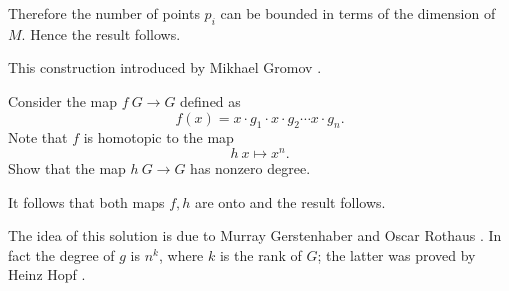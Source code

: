 Therefore the number of points $p_i$ can be bounded in terms of the dimension of $M$.
Hence the result follows.
\qeds

This construction introduced by Mikhael Gromov \cite[see][]{gromov-almost-flat}.

Consider the map $f\:G\to G$ defined as
\[f(x)=x\cdot g_1\cdot x\cdot g_2\cdots x\cdot g_n.\]
Note that $f$ is homotopic to the map 
\[h\:x\mapsto x^n.\]
Show that  the map $h\:G\to G$ has nonzero degree.

It follows that both maps $f,h$ are onto and the result follows.
\qeds

The idea of this solution is due to Murray Gerstenhaber and Oscar Rothaus 
\cite[see][]{gerstenhaber-rothaus}.
In fact the degree of $g$ is $n^k$, where $k$ is the rank of $G$;
the latter was proved by Heinz Hopf \cite[see][]{hopf}.
